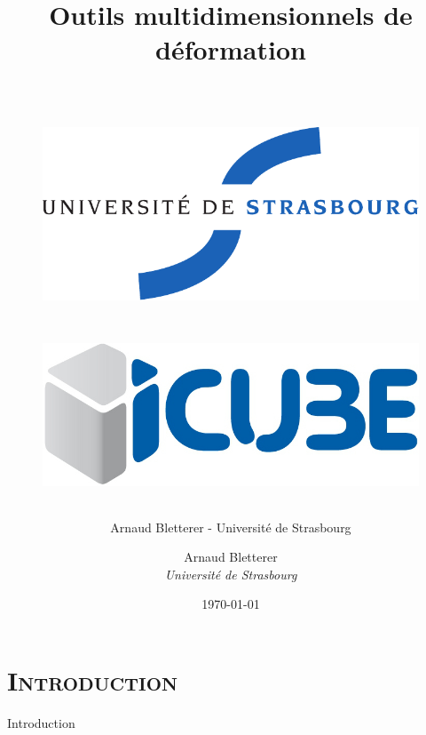 \documentclass[xcolor=x11names,compress]{beamer}
\author{Arnaud Bletterer - Université de Strasbourg}
\renewcommand{\(}{\begin{columns}} \renewcommand{\)}{\end{columns}}
\newcommand{\<}[1]{\begin{column}{#1}} \renewcommand{\>}{\end{column}}
\begin{document}
\section{\scshape Introduction}
\begin{frame}
  \title{Outils multidimensionnels de déformation\\~\\

    \begin{figure}[h]
      \includegraphics[scale=0.3]{UDS-logo.pdf}~~~~~
      \includegraphics[scale=0.26]{icube-logo.jpg}
    \end{figure}
  } \date{\vspace{0.5cm} \today }

  \author{Arnaud Bletterer\\
    \it Université de Strasbourg}

  \titlepage
\end{frame}

\begin{frame}{Introduction}
  \tableofcontents
\end{frame}

\end{document}

